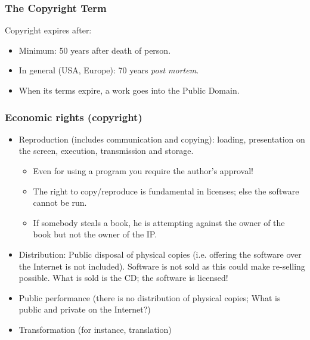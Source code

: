 
\begin{frame}
\frametitle{The Copyright Term}

Copyright expires after:

\begin{itemize}
\item Minimum: 50 years after death of person. 
\item In general (USA, Europe): 70 years \textit{post mortem}.
\item When its terms expire, a work goes into the Public Domain.

\end{itemize}

\end{frame}


\begin{frame}
\frametitle{Economic rights (copyright)}

\begin{itemize}
\item Reproduction (includes communication and copying): loading,
presentation on the screen, execution, transmission and storage.
\begin{itemize}
\item Even for using a program you require the author's approval!
\item The right to copy/reproduce is fundamental in licenses; else
the software cannot be run.
\item If somebody steals a book, he is attempting against the owner
of the book but not the owner of the IP. 
\end{itemize}
\item Distribution: Public disposal of physical copies (i.e. offering
the software over the Internet is not included). Software is not
sold as this could make re-selling possible. What is sold is the CD; the
software is licensed!
\item Public performance (there is no distribution of physical copies; What is public and private
on the Internet?)
\item Transformation (for instance, translation)
\end{itemize}


\end{frame}



